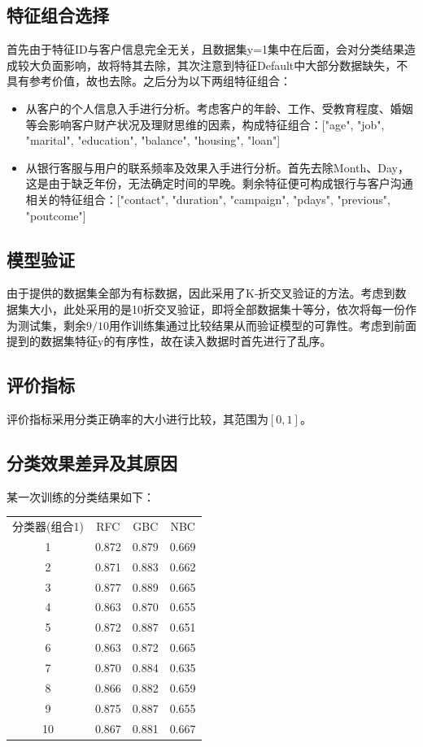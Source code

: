\documentclass{acm_proc_article-sp}
\begin{document}
\subsection{特征组合选择}
首先由于特征ID与客户信息完全无关，且数据集y=1集中在后面，会对分类结果造成较大负面影响，故将特其去除，其次注意到特征Default中大部分数据缺失，不具有参考价值，故也去除。之后分为以下两组特征组合：
\begin{itemize}
    \item 从客户的个人信息入手进行分析。考虑客户的年龄、工作、受教育程度、婚姻等会影响客户财产状况及理财思维的因素，构成特征组合：["age", "job", "marital", "education", "balance", "housing", "loan"]
    \item 从银行客服与用户的联系频率及效果入手进行分析。首先去除Month、Day，这是由于缺乏年份，无法确定时间的早晚。剩余特征便可构成银行与客户沟通相关的特征组合：["contact", "duration", "campaign", "pdays", "previous", "poutcome"]
\end{itemize}

\subsection{模型验证}
由于提供的数据集全部为有标数据，因此采用了K-折交叉验证的方法。考虑到数据集大小，此处采用的是10折交叉验证，即将全部数据集十等分，依次将每一份作为测试集，剩余$9/10$用作训练集通过比较结果从而验证模型的可靠性。考虑到前面提到的数据集特征y的有序性，故在读入数据时首先进行了乱序。
\subsection{评价指标}
评价指标采用分类正确率的大小进行比较，其范围为$[0, 1]$。
\subsection{分类效果差异及其原因}
某一次训练的分类结果如下：\\
\begin{tabular}{cccc}
分类器(组合1)&RFC&GBC&NBC \\
1&0.872&0.879&0.669 \\
2&0.871&0.883&0.662 \\
3&0.877&0.889&0.665 \\
4&0.863&0.870&0.655 \\
5&0.872&0.887&0.651 \\
6&0.863&0.872&0.665 \\
7&0.870&0.884&0.635 \\
8&0.866&0.882&0.659 \\
9&0.875&0.887&0.655 \\
10&0.867&0.881&0.667
\end{tabular}
\end{document}
